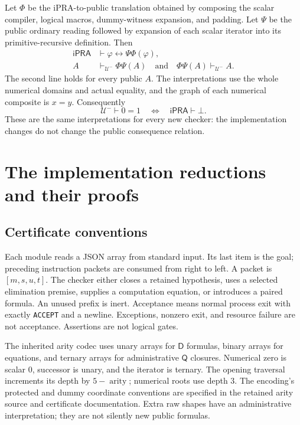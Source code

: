 \documentclass[11pt,letterpaper]{article}
\theoremstyle{definition}\newtheorem{definition}[theorem]{Definition}
\theoremstyle{remark}\newtheorem{remark}[theorem]{Remark}
\newcommand{\ipra}{\mathsf{iPRA}}
\newcommand{\Ucal}{\mathcal U^{-}}
\newcommand{\Q}{\mathsf Q}
\newcommand{\D}{\mathsf D}
\begin{document}
Let $\Phi$ be the iPRA-to-public translation obtained by composing the
scalar compiler, logical macros, dummy-witness expansion, and padding.
Let $\Psi$ be the public ordinary reading followed by expansion of each
scalar iterator into its primitive-recursive definition. Then
\begin{align*}
 \ipra&\vdash\varphi\leftrightarrow\Psi\Phi(\varphi),\\
 A&\vdash_{\Ucal}\Phi\Psi(A)
       \quad\text{and}\quad\Phi\Psi(A)\vdash_{\Ucal}A.
\end{align*}
The second line holds for every public $A$. The interpretations
use the whole numerical domains and actual equality, and the graph of each
numerical composite is $x=y$. Consequently
\[
 \Ucal\vdash 0=1\quad\Longleftrightarrow\quad\ipra\vdash\bot.
\]
These are the same interpretations for every new checker: the
implementation changes do not change the public consequence relation.

\section{The implementation reductions and their proofs}
\label{sec:implementation}

\subsection{Certificate conventions}

Each module reads a JSON array from standard input. Its last item is the
goal; preceding instruction packets are consumed from right to left. A
packet is $[m,s,u,t]$. The checker either closes a retained hypothesis,
uses a selected elimination premise, supplies a computation equation, or
introduces a paired formula. An unused prefix is inert. Acceptance means
normal process exit with exactly \texttt{ACCEPT} and a newline. Exceptions,
nonzero exit, and resource failure are not acceptance. Assertions are not
logical gates.

The inherited arity codec uses unary arrays for $\D$ formulas, binary
arrays for equations, and ternary arrays for administrative $\Q$ closures.
Numerical zero is scalar $0$, successor is unary, and the iterator is
ternary. The opening traversal increments its depth by
$5-\operatorname{arity}$; numerical roots use depth $3$. The encoding's
protected and dummy coordinate conventions are specified in the retained
arity source and certificate documentation. Extra raw shapes have an
administrative interpretation; they are not silently new public formulas.
\end{document}
